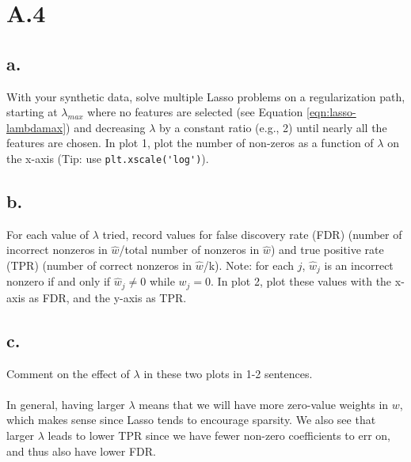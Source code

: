 \documentclass{article}
\newcommand{\1}{\mathbf{1}}
\begin{document}
\section*{A.4}
{\Large 



\subsection*{a.}

With your synthetic data, solve multiple Lasso problems on a regularization path, starting at $\lambda_{max}$ where no features are selected (see Equation \eqref{eqn:lasso-lambdamax}) and decreasing $\lambda$ by a constant ratio (e.g., 2) until nearly all the features are chosen. 
    In plot 1, plot the number of non-zeros as a function of $\lambda$ on the x-axis (Tip: use \verb|plt.xscale('log')|).

\subsection*{b.}

For each value of $\lambda$ tried, record values for false discovery rate (FDR) (number of incorrect nonzeros in $\widehat{w}$/total number of nonzeros in $\widehat{w}$) and true positive rate (TPR)
    (number of correct nonzeros in $\widehat{w}$/k). Note: for each $j$, $\widehat{w}_j$ is an incorrect nonzero if and only if $\widehat{w}_j \neq 0$ while $w_j = 0$.
In plot 2, plot these values with the x-axis as FDR, and the y-axis as TPR.

\subsection*{c.}

Comment on the effect of $\lambda$ in these two plots in 1-2 sentences. \\ \\
In general, having larger $\lambda$ means that we will have more zero-value weights in $w$, which makes sense since Lasso tends to encourage sparsity. We also see that larger $\lambda$ leads to lower TPR since we have fewer non-zero coefficients to err on, and thus also have lower FDR.

}
\end{document}
